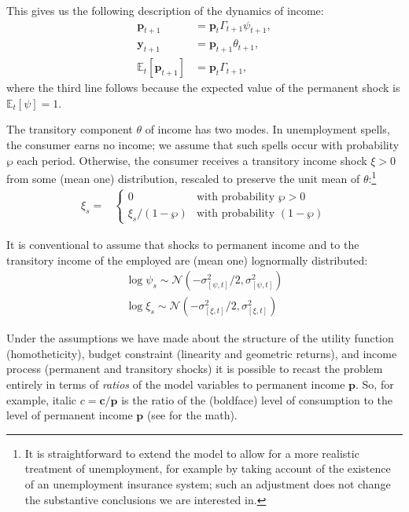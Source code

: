 \documentclass{article}
\newcommand{\cLvl}{\mathbf{c}}
\newcommand{\yLvl}{\mathbf{y}}
\newcommand{\pLvl}{\mathbf{p}}
\newcommand{\Ex}{\mathbb{E}}
\newcommand{\permGroFac}{\Gamma}
\newcommand{\permShk}{\psi}
\newcommand{\tranShk}{\theta}
\newcommand{\pZero}{\wp}
\newcommand{\tranShkEmp}{\xi}
\newcommand{\cNrm}{c}
\begin{document}
This gives us the following description of the dynamics of income:
\begin{align}
    \pLvl_{t+1} & = \pLvl_{t} \permGroFac_{t+1} \permShk_{t+1}, \\
    \yLvl_{t+1} & = \pLvl_{t+1} \tranShk_{t+1}, \\
    \Ex_{t}[\pLvl_{t+1}] & = \pLvl_{t} \permGroFac_{t+1},
\end{align}
where the third line follows because the expected value of the permanent shock is $\Ex_{t}[\permShk]=1$.

The transitory component $\tranShk$ of income has two modes.
In unemployment spells, the consumer earns no income; we assume that such spells occur with probability $\pZero$ each period.
Otherwise, the consumer receives a transitory income shock $\xi > 0$ from some (mean one) distribution, rescaled to preserve the unit mean of $\tranShk$:\footnote{It is straightforward to extend the model to allow for a more realistic treatment of unemployment, for example by taking account of the existence of an unemployment insurance system; such an adjustment does not change the substantive conclusions we are interested in.}
\begin{align}
    \tranShkEmp_{s} = &
    \begin{cases}
        0\phantom{/\pZero} & \text{with probability $\pZero>0$}
        \\ \xi_{s}/(1-\pZero) & \text{with probability $(1-\pZero)$}
    \end{cases}
\end{align}

It is conventional to assume that shocks to permanent income and to the transitory income of the employed are (mean one) lognormally distributed:
\begin{align}
    \log \permShk_{s} \sim \mathcal{N}(-\sigma_{[\permShk, t]}^{2}/2,\sigma_{[\permShk, t]}^{2})
    \\ \log \xi_{s} \sim \mathcal{N}(-\sigma_{[\xi, t]}^{2}/2,\sigma_{[\xi, t]}^{2})
\end{align}


Under the assumptions we have made about the structure of the utility function (homotheticity), budget constraint (linearity and geometric returns), and income process (permanent and transitory shocks) it is possible to recast the problem entirely in terms of \textit{ratios} of the model variables to permanent income $\pLvl$.
So, for example, italic $\cNrm = \cLvl/\pLvl$ is the ratio of the (boldface) level of consumption to the level of permanent income $\pLvl$ (see \cite{BufferStockTheory} for the math).
\end{document}
